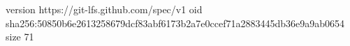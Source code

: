 version https://git-lfs.github.com/spec/v1
oid sha256:50850b6e2613258679dcf83abf6173b2a7e0ccef71a2883445db36e9a9ab0654
size 71
